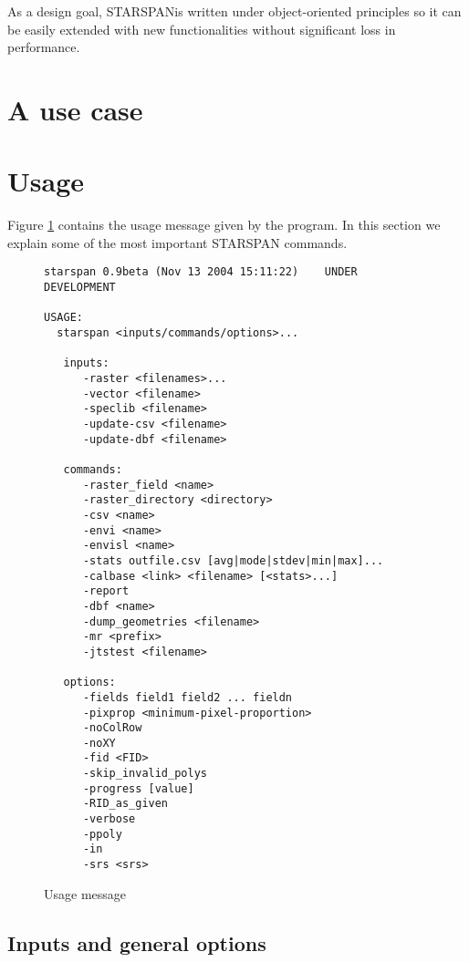 \documentclass{elsart}
\newcommand{\starspan}{STARSPAN{}}
\begin{document}
	As a design goal, \starspan is written under object-oriented principles
	so it can be easily extended with new functionalities without significant
	loss in performance.


\section{A use case}

\section{Usage}

Figure \ref{fig-usage} contains the usage message given by the program.
In this section we explain some of the most important \starspan{} commands.
\begin{figure}[!ht]
\centering
\caption{Usage message}
\scriptsize{
\begin{verbatim}
starspan 0.9beta (Nov 13 2004 15:11:22)    UNDER DEVELOPMENT

USAGE:
  starspan <inputs/commands/options>...

   inputs:
      -raster <filenames>...
      -vector <filename>
      -speclib <filename>
      -update-csv <filename>
      -update-dbf <filename>

   commands:
      -raster_field <name>
      -raster_directory <directory>
      -csv <name>
      -envi <name>
      -envisl <name>
      -stats outfile.csv [avg|mode|stdev|min|max]...
      -calbase <link> <filename> [<stats>...]
      -report
      -dbf <name>
      -dump_geometries <filename>
      -mr <prefix>
      -jtstest <filename>

   options:
      -fields field1 field2 ... fieldn
      -pixprop <minimum-pixel-proportion>
      -noColRow
      -noXY
      -fid <FID>
      -skip_invalid_polys
      -progress [value]
      -RID_as_given
      -verbose
      -ppoly
      -in
      -srs <srs>
\end{verbatim}
}
\label{fig-usage}
\end{figure}

\subsection{Inputs and general options}
\end{document}
